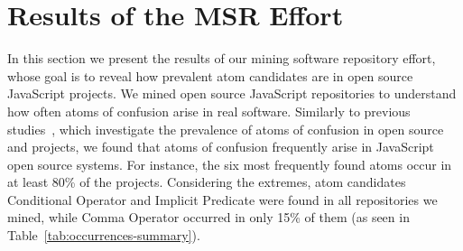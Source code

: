 
\section{Results of the MSR Effort}
\label{sec:msr-results} 

In this section we present the results of our mining software repository effort, whose goal is to reveal how prevalent atom candidates are in open source JavaScript projects. 
We mined \minedprojects open source JavaScript repositories to understand how
often atoms of confusion arise in real software. 
Similarly to previous studies~\cite{DBLP:conf/msr/GopsteinZFC18,DBLP:journals/ese/MedeirosLAAKRG19}, which investigate
the prevalence of atoms of confusion in open source \clang and \cpplang projects, we found that atoms of confusion
frequently arise in JavaScript open source systems. For instance, the six most frequently found atoms
occur in at least 80\% of the projects. Considering the extremes, atom candidates Conditional Operator and Implicit Predicate were found in all repositories we mined,
while Comma Operator occurred in only 15\% of them (as seen in Table~\ref{tab:occurrences-summary}).

